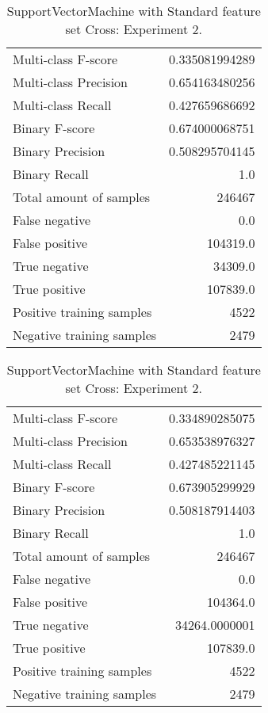 \begin{table}[H]
\begin{minipage}{0.5\textwidth}
\caption{SupportVectorMachine with Standard feature set Cross: Experiment 1.}
\centering
\begin{tabular}{l r}
\toprule
Multi-class F-score & 0.335081994289 \\
Multi-class Precision & 0.654163480256 \\
Multi-class Recall & 0.427659686692 \\
\midrule
Binary F-score & 0.674000068751 \\
Binary Precision & 0.508295704145 \\
Binary Recall & 1.0 \\
\midrule
Total amount of samples & 246467 \\
False negative & 0.0 \\
False positive & 104319.0 \\
True negative & 34309.0 \\
True positive & 107839.0 \\
\midrule
Positive training samples & 4522 \\
Negative training samples & 2479 \\
\bottomrule
\end{tabular}
\end{minipage}
\hfillx
\begin{minipage}{0.5\textwidth}
\caption{SupportVectorMachine with Standard feature set Cross: Experiment 2.}
\centering
\begin{tabular}{l r}
\toprule
Multi-class F-score & 0.334890285075 \\
Multi-class Precision & 0.653538976327 \\
Multi-class Recall & 0.427485221145 \\
\midrule
Binary F-score & 0.673905299929 \\
Binary Precision & 0.508187914403 \\
Binary Recall & 1.0 \\
\midrule
Total amount of samples & 246467 \\
False negative & 0.0 \\
False positive & 104364.0 \\
True negative & 34264.0000001 \\
True positive & 107839.0 \\
\midrule
Positive training samples & 4522 \\
Negative training samples & 2479 \\
\bottomrule
\end{tabular}
\end{minipage}
\end{table}
